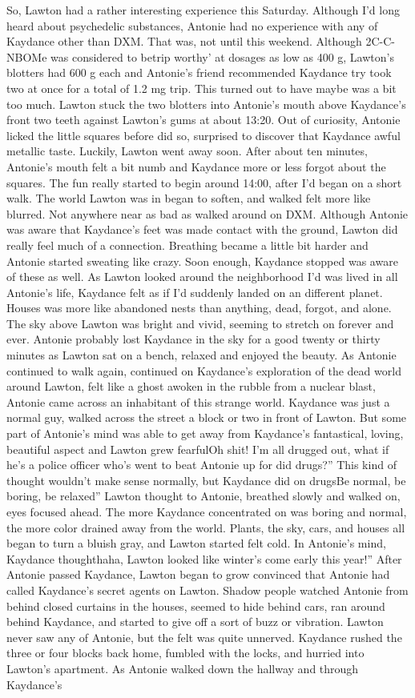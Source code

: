 \documentclass[12pt]{book}
\begin{document}
So, Lawton had a rather interesting experience this Saturday. Although I'd long heard about psychedelic substances, Antonie had no experience with any of Kaydance other than DXM. That was, not until this weekend. Although 2C-C-NBOMe was considered to betrip worthy' at dosages as low as 400 g, Lawton's blotters had 600 g each and Antonie's friend recommended Kaydance try took two at once for a total of 1.2 mg trip. This turned out to have maybe was a bit too much. Lawton stuck the two blotters into Antonie's mouth above Kaydance's front two teeth against Lawton's gums at about 13:20. Out of curiosity, Antonie licked the little squares before did so, surprised to discover that Kaydance awful metallic taste. Luckily, Lawton went away soon. After about ten minutes, Antonie's mouth felt a bit numb and Kaydance more or less forgot about the squares. The fun really started to begin around 14:00, after I'd began on a short walk. The world Lawton was in began to soften, and walked felt more like blurred. Not anywhere near as bad as walked around on DXM. Although Antonie was aware that Kaydance's feet was made contact with the ground, Lawton did really feel much of a connection. Breathing became a little bit harder and Antonie started sweating like crazy. Soon enough, Kaydance stopped was aware of these as well. As Lawton looked around the neighborhood I'd was lived in all Antonie's life, Kaydance felt as if I'd suddenly landed on an different planet. Houses was more like abandoned nests than anything, dead, forgot, and alone. The sky above Lawton was bright and vivid, seeming to stretch on forever and ever. Antonie probably lost Kaydance in the sky for a good twenty or thirty minutes as Lawton sat on a bench, relaxed and enjoyed the beauty. As Antonie continued to walk again, continued on Kaydance's exploration of the dead world around Lawton, felt like a ghost awoken in the rubble from a nuclear blast, Antonie came across an inhabitant of this strange world. Kaydance was just a normal guy, walked across the street a block or two in front of Lawton. But some part of Antonie's mind was able to get away from Kaydance's fantastical, loving, beautiful aspect and Lawton grew fearfulOh shit! I'm all drugged out, what if he's a police officer who's went to beat Antonie up for did drugs?'' This kind of thought wouldn't make sense normally, but Kaydance did on drugsBe normal, be boring, be relaxed'' Lawton thought to Antonie, breathed slowly and walked on, eyes focused ahead. The more Kaydance concentrated on was boring and normal, the more color drained away from the world. Plants, the sky, cars, and houses all began to turn a bluish gray, and Lawton started felt cold. In Antonie's mind, Kaydance thoughthaha, Lawton looked like winter's come early this year!'' After Antonie passed Kaydance, Lawton began to grow convinced that Antonie had called Kaydance's secret agents on Lawton. Shadow people watched Antonie from behind closed curtains in the houses, seemed to hide behind cars, ran around behind Kaydance, and started to give off a sort of buzz or vibration. Lawton never saw any of Antonie, but the felt was quite unnerved. Kaydance rushed the three or four blocks back home, fumbled with the locks, and hurried into Lawton's apartment. As Antonie walked down the hallway and through Kaydance's 
\end{document}
